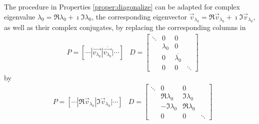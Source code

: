 \begin{proper}
\label{proper:diagonalize2}
The procedure in Properties \ref{proper:diagonalize} can be adapted for complex eigenvalue $\lambda_0 = \Re{\lambda_0} + \imath \Im{\lambda_0}$, the corresponding eigenvector $\vec{v}_{\lambda_0} = \Re{\vec{v}_{\lambda_0}} + \imath \Im{\vec{v}_{\lambda_0}}$, as well as their complex conjugates, by replacing the corresponding columns in
\begin{align*}
&P = [\cdots|\vec{v_{\lambda_0}}|\overline{\vec{v_{\lambda_0}}}|\cdots]
&D =
\begin{bmatrix}
\ddots & 0 & 0 & \\
& \lambda_0 & 0 & \\
& 0 & \overline{\lambda_0} & \\
& 0 & 0 & \ddots
\end{bmatrix}
\end{align*}
by
\begin{align*}
&P = [\cdots|\Re{\vec{v}_{\lambda_0}}|\Im{\vec{v}_{\lambda_0}}|\cdots]
&D =
\begin{bmatrix}
\ddots & 0 & 0 & \\
& \Re{\lambda_0} & \Im{\lambda_0} & \\
& -\Im{\lambda_0} & \Re{\lambda_0} & \\
& 0 & 0 & \ddots
\end{bmatrix}
\end{align*}
\end{proper}
